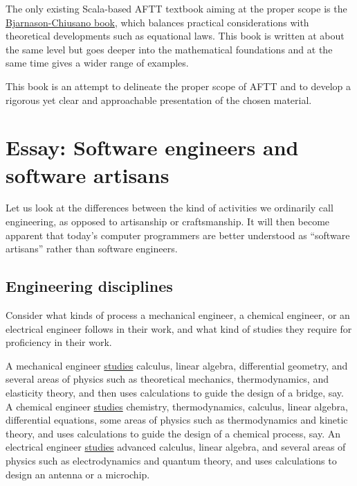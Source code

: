 The only existing Scala-based AFTT textbook aiming at the proper scope
is the \href{https://www.manning.com/books/functional-programming-in-scala}{Bjarnason-Chiusano book},
which balances practical considerations with theoretical developments
such as equational laws. This book is written at about the same level
but goes deeper into the mathematical foundations and at the same
time gives a wider range of examples.

This book is an attempt to delineate the proper scope of AFTT and
to develop a rigorous yet clear and approachable presentation of the
chosen material. 

\chapter{Essay: Software engineers and software artisans}

Let us look at the differences between the kind of activities we ordinarily
call engineering, as opposed to artisanship or craftsmanship. It will
then become apparent that today's computer programmers are better
understood as ``software artisans'' rather than software engineers.

\section{Engineering disciplines }

Consider what kinds of process a mechanical engineer, a chemical engineer,
or an electrical engineer follows in their work, and what kind of
studies they require for proficiency in their work.

A mechanical engineer \href{https://www.colorado.edu/mechanical/undergraduate-students/curriculum}{studies}
calculus, linear algebra, differential geometry, and several areas
of physics such as theoretical mechanics, thermodynamics, and elasticity
theory, and then uses calculations to guide the design of a bridge,
say. A chemical engineer \href{https://www.colorado.edu/engineering/sample-undergraduate-curriculum-chemical}{studies}
chemistry, thermodynamics, calculus, linear algebra, differential
equations, some areas of physics such as thermodynamics and kinetic
theory, and uses calculations to guide the design of a chemical process,
say. An electrical engineer \href{https://seas.yale.edu/departments/electrical-engineering/undergraduate-study/undergraduate-curriculum-information}{studies}
advanced calculus, linear algebra, and several areas of physics such
as electrodynamics and quantum theory, and uses calculations to design
an antenna or a microchip.

